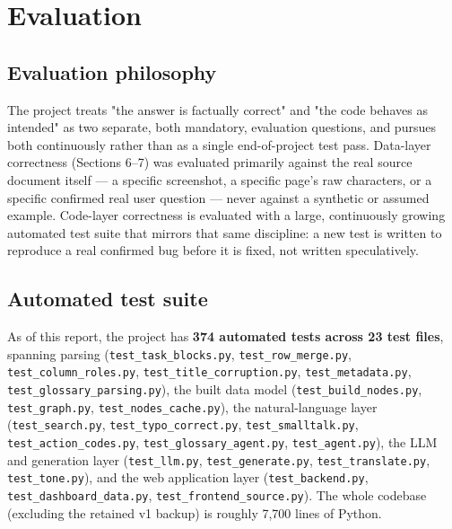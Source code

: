 \chapter{Evaluation}
\label{ch:evaluation}
\section{Evaluation philosophy}
The project treats "the answer is factually correct" and "the code behaves as intended" as two separate, both mandatory, evaluation questions, and pursues both continuously rather than as a single end-of-project test pass. Data-layer correctness (Sections 6–7) was evaluated primarily against the real source document itself — a specific screenshot, a specific page's raw characters, or a specific confirmed real user question — never against a synthetic or assumed example. Code-layer correctness is evaluated with a large, continuously growing automated test suite that mirrors that same discipline: a new test is written to reproduce a real confirmed bug before it is fixed, not written speculatively.

\section{Automated test suite}
As of this report, the project has \textbf{374 automated tests across 23 test files}, spanning parsing (\texttt{test\_\allowbreak{}task\_\allowbreak{}blocks.py}, \texttt{test\_\allowbreak{}row\_\allowbreak{}merge.py}, \texttt{test\_\allowbreak{}column\_\allowbreak{}roles.py}, \texttt{test\_\allowbreak{}title\_\allowbreak{}corruption.py}, \texttt{test\_\allowbreak{}metadata.py}, \texttt{test\_\allowbreak{}glossary\_\allowbreak{}parsing.py}), the built data model (\texttt{test\_\allowbreak{}build\_\allowbreak{}nodes.py}, \texttt{test\_\allowbreak{}graph.py}, \texttt{test\_\allowbreak{}nodes\_\allowbreak{}cache.py}), the natural-language layer (\texttt{test\_\allowbreak{}search.py}, \texttt{test\_\allowbreak{}typo\_\allowbreak{}correct.py}, \texttt{test\_\allowbreak{}smalltalk.py}, \texttt{test\_\allowbreak{}action\_\allowbreak{}codes.py}, \texttt{test\_\allowbreak{}glossary\_\allowbreak{}agent.py}, \texttt{test\_\allowbreak{}agent.py}), the LLM and generation layer (\texttt{test\_\allowbreak{}llm.py}, \texttt{test\_\allowbreak{}generate.py}, \texttt{test\_\allowbreak{}translate.py}, \texttt{test\_\allowbreak{}tone.py}), and the web application layer (\texttt{test\_\allowbreak{}backend.py}, \texttt{test\_\allowbreak{}dashboard\_\allowbreak{}data.py}, \texttt{test\_\allowbreak{}frontend\_\allowbreak{}source.py}). The whole codebase (excluding the retained v1 backup) is roughly 7,700 lines of Python.

